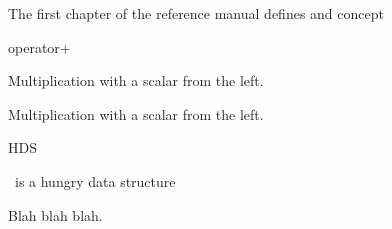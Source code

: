 \label{first_ref_chap_label}

The first chapter of the reference manual defines 
and  concept

\gdef\ccTagOperatorLayout{\ccFalse}
\begin{ccRefFunction}{operator+}


       {Multiplication with a scalar from the left.}


       {Multiplication with a scalar from the left.}
\end{ccRefFunction}

\begin{ccRefConcept}{HDS}

\ccDefinition
\ccRefName\ is a hungry data structure

Blah blah blah.
\end{ccRefConcept}
